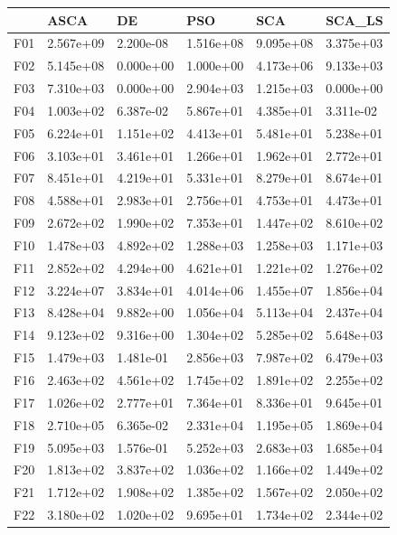 \begin{tabular}{llllll}
\toprule
{} &       ASCA &         DE &        PSO &        SCA &     SCA\_LS \\
\midrule
F01  &  2.567e+09 &  2.200e-08 &  1.516e+08 &  9.095e+08 &  3.375e+03 \\
F02  &  5.145e+08 &  0.000e+00 &  1.000e+00 &  4.173e+06 &  9.133e+03 \\
F03  &  7.310e+03 &  0.000e+00 &  2.904e+03 &  1.215e+03 &  0.000e+00 \\
F04  &  1.003e+02 &  6.387e-02 &  5.867e+01 &  4.385e+01 &  3.311e-02 \\
F05  &  6.224e+01 &  1.151e+02 &  4.413e+01 &  5.481e+01 &  5.238e+01 \\
F06  &  3.103e+01 &  3.461e+01 &  1.266e+01 &  1.962e+01 &  2.772e+01 \\
F07  &  8.451e+01 &  4.219e+01 &  5.331e+01 &  8.279e+01 &  8.674e+01 \\
F08  &  4.588e+01 &  2.983e+01 &  2.756e+01 &  4.753e+01 &  4.473e+01 \\
F09  &  2.672e+02 &  1.990e+02 &  7.353e+01 &  1.447e+02 &  8.610e+02 \\
F10  &  1.478e+03 &  4.892e+02 &  1.288e+03 &  1.258e+03 &  1.171e+03 \\
F11  &  2.852e+02 &  4.294e+00 &  4.621e+01 &  1.221e+02 &  1.276e+02 \\
F12  &  3.224e+07 &  3.834e+01 &  4.014e+06 &  1.455e+07 &  1.856e+04 \\
F13  &  8.428e+04 &  9.882e+00 &  1.056e+04 &  5.113e+04 &  2.437e+04 \\
F14  &  9.123e+02 &  9.316e+00 &  1.304e+02 &  5.285e+02 &  5.648e+03 \\
F15  &  1.479e+03 &  1.481e-01 &  2.856e+03 &  7.987e+02 &  6.479e+03 \\
F16  &  2.463e+02 &  4.561e+02 &  1.745e+02 &  1.891e+02 &  2.255e+02 \\
F17  &  1.026e+02 &  2.777e+01 &  7.364e+01 &  8.336e+01 &  9.645e+01 \\
F18  &  2.710e+05 &  6.365e-02 &  2.331e+04 &  1.195e+05 &  1.869e+04 \\
F19  &  5.095e+03 &  1.576e-01 &  5.252e+03 &  2.683e+03 &  1.685e+04 \\
F20  &  1.813e+02 &  3.837e+02 &  1.036e+02 &  1.166e+02 &  1.449e+02 \\
F21  &  1.712e+02 &  1.908e+02 &  1.385e+02 &  1.567e+02 &  2.050e+02 \\
F22  &  3.180e+02 &  1.020e+02 &  9.695e+01 &  1.734e+02 &  2.344e+02 \\

\end{tabular}
